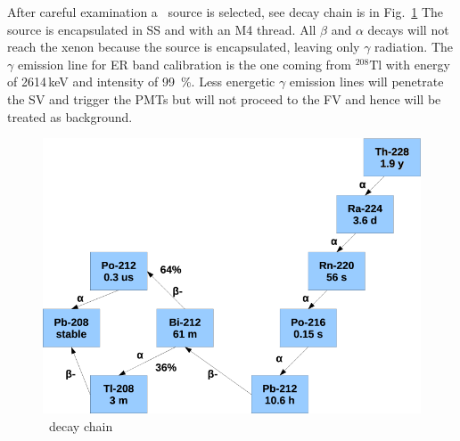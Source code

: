 After careful examination a \Th\ source is selected, see decay chain is in Fig.~\ref{fig:th228} The source is encapsulated in SS and with an M4 thread. All $\beta$ and $\alpha$ decays will not reach the xenon because the source is encapsulated, leaving only $\gamma$ radiation. The $\gamma$ emission line for ER band calibration is the one coming from $^{208}\mathrm{Tl}$ with energy of 2614\,keV and intensity of 99~\%. Less energetic $\gamma$ emission lines will penetrate the SV and trigger the PMTs but will not proceed to the FV and hence will be treated as background. 

\begin{figure}
	\begin{center}
	\includegraphics[height= 0.5\textheight]{figs/Th228Check.PNG}%
		\caption{\label{fig:th228} \Th\ decay chain }
		\end{center}
	
	\end{figure} 
 

